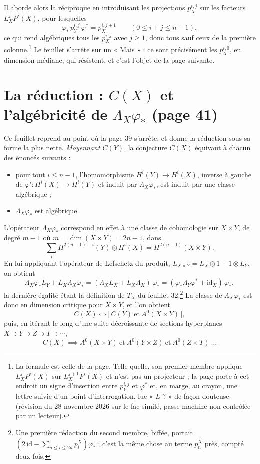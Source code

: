 \documentclass[11pt,a4paper]{article}
\begin{document}
Il aborde alors la réciproque en introduisant les projections $p^{i,j}_{X}$ sur
les facteurs $L_{X}^{j}P^{i}(X)$, pour lesquelles
\[
\varphi_{*}\,p^{i,j}_{Y}\,\varphi^{*} = p^{i,j+1}_{X}
\qquad (0 \leqslant i+j \leqslant n-1),
\]
ce qui rend algébriques tous les $p^{i,j}_{X}$ avec $j \geqslant 1$, donc tous
sauf ceux de la première colonne.\footnote{La formule est celle de la page. Telle quelle, son premier membre
applique $L_{X}^{j}P^{i}(X)$ sur $L_{X}^{j+1}P^{i}(X)$ et n'est pas un
projecteur ; la page porte à cet endroit un signe d'insertion entre
$p^{i,j}_{Y}$ et $\varphi^{*}$ et, en marge, au crayon, une lettre suivie d'un
point d'interrogation, lue « $L$ ? » de façon douteuse (révision du 28 novembre 2026 sur le fac-similé, passe machine non contrôlée par un lecteur).} Le feuillet s'arrête sur un « Mais » : ce
sont précisément les $p^{i,0}_{X}$, en dimension médiane, qui résistent, et
c'est l'objet de la page suivante.

\section*{La réduction : $C(X)$ et l'algébricité de $\Lambda_{X}\varphi_{*}$ (page 41)}

Ce feuillet reprend au point où la page 39 s'arrête, et donne la réduction sous
sa forme la plus nette. \emph{Moyennant $C(Y)$}, la conjecture $C(X)$ équivaut
à chacun des énoncés suivants :

\begin{itemize}
  \item pour tout $i \leqslant n-1$, l'homomorphisme
  $H^{i}(Y) \to H^{i}(X)$, inverse à gauche de
  $\varphi^{i} \colon H^{i}(X) \to H^{i}(Y)$ et induit par
  $\Lambda_{X}\varphi_{*}$, est induit par une classe algébrique ;
  \item $\Lambda_{X}\varphi_{*}$ est algébrique.
\end{itemize}

L'opérateur $\Lambda_{X}\varphi_{*}$ correspond en effet à une classe de
cohomologie sur $X \times Y$, de degré $m - 1$ où $m = \dim(X \times Y) =
2n-1$, dans
\[
\sum_{i} H^{2(n-1)-i}(Y) \otimes H^{i}(X) = H^{2(n-1)}(X \times Y) .
\]
En lui appliquant l'opérateur de Lefschetz du produit,
$L_{X \times Y} = L_{X} \otimes 1 + 1 \otimes L_{Y}$, on obtient
\[
\Lambda_{X}\varphi_{*}L_{Y} + L_{X}\Lambda_{X}\varphi_{*}
= (\Lambda_{X}L_{X} + L_{X}\Lambda_{X})\,\varphi_{*}
= (\varphi_{*}\Lambda_{Y}\varphi^{*} + \mathrm{id}_{X})\,\varphi_{*},
\]
la dernière égalité étant la définition de $T_{X}$ du feuillet
32.\footnote{Une première rédaction du second membre, biffée, portait
$(2\,\mathrm{id} - \sum_{n \leqslant i \leqslant 2n}p^{X}_{i})\varphi_{*}$ ;
c'est la même chose au terme $p^{X}_{n}$ près, compté deux fois.} La classe de
$\Lambda_{X}\varphi_{*}$ est donc en dimension critique pour $X \times Y$, et
l'on obtient
\[
C(X) \iff \bigl[\,C(Y) \ \text{et}\ A^{0}(X \times Y)\,\bigr],
\]
puis, en itérant le long d'une suite décroissante de sections hyperplanes
$X \supset Y \supset Z \supset T \supset \cdots$,
\[
C(X) \implies A^{0}(X \times Y) \ \text{et}\ A^{0}(Y \times Z)
\ \text{et}\ A^{0}(Z \times T) \ \ldots
\]
\end{document}
